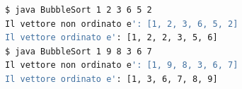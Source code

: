 \begin{lstlisting}[language=Bash]
$ java BubbleSort 1 2 3 6 5 2
Il vettore non ordinato e': [1, 2, 3, 6, 5, 2]
Il vettore ordinato e': [1, 2, 2, 3, 5, 6]
$ java BubbleSort 1 9 8 3 6 7
Il vettore non ordinato e': [1, 9, 8, 3, 6, 7]
Il vettore ordinato e': [1, 3, 6, 7, 8, 9]
\end{lstlisting}
